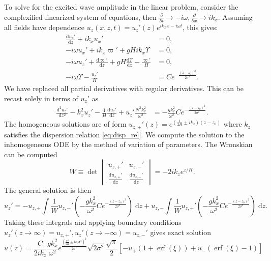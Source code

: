 \documentclass[
        fleqn,
        usenatbib,
    ]{mnras}
\newcommand*{\rd}[2]{\frac{\mathrm{d}#1}{\mathrm{d}#2}}
\newcommand*{\rtd}[2]{\frac{\mathrm{d}^2#1}{\mathrm{d}#2^2}}
\newcommand*{\pd}[2]{\frac{\partial#1}{\partial#2}}
\newcommand*{\p}[1]{\left(#1\right)}
\newcommand*{\s}[1]{\left[#1\right]}
\DeclareMathOperator*{\erf}{erf}
\begin{document}
To solve for the excited wave amplitude in the linear problem, consider the
complexified linearized system of equations, then $\pd{}{t} \to -i\omega,
\pd{}{x} \to ik_x$. Assuming all fields have dependence $u_z(x, z, t) = u_z'(z)
e^{ik_xx - i\omega t}$, this gives:
\begin{align*}
    \rd{u_{z}'}{z} + ik_xu_x' &= 0,\\
    -i\omega u_x' + ik_x \varpi' + gHik_x \Upsilon &= 0,\\
    -i\omega u_{z}' + \rd{\varpi'}{z} + gH\rd{\Upsilon}{z}
        - \frac{\varpi'}{H} &= 0,\\
    -i\omega \Upsilon - \frac{u_{z}'}{H} &=
        Ce^{-\frac{(z - z_0)^2}{2\sigma^2}}.
\end{align*}
We have replaced all partial derivatives with regular derivatives. This can be
recast solely in terms of $u_{z}'$ as
\begin{align*}
     \rtd{u_{z}'}{z} - k_x^2u_{z}' - \frac{1}{H}\rd{u_{z}'}{z}
        + u_{z}'\frac{N^2k_x^2}{\omega^2} &=
    -\frac{gk_x^2}{\omega^2}Ce^{-\frac{(z - z_0)^2}{2\sigma^2}}
        .\label{eq:narrow_inhomo}
\end{align*}
The homogeneous solutions are of form $u_{z,\pm}'(z) = e^{\p{\frac{1}{2H} \pm
ik_z}\p{z - z_0}}$ where $k_z$ satisfies the dispersion relation
\autoref{eq:disp_rel}. We compute the solution to the inhomogeneous ODE by the
method of variation of parameters. The Wronskian can be computed
\begin{equation}
    W \equiv \det \begin{vmatrix}
        u_{z,+}' & u_{z,-}' \\[4pt]
        \rd{u_{z,+}'}{z} & \rd{u_{z,-}'}{z}
    \end{vmatrix} = -2ik_ze^{z/H}.
\end{equation}
The general solution is then
\begin{equation}
    u_z' = -u_{z,+}\int \frac{1}{W} u_{z,-}' \p{-\frac{gk_x^2}{\omega^2}
            Ce^{-\frac{(z - z_0)^2}{2\sigma^2}}}\;\mathrm{d}z
        + u_{z,-}\int \frac{1}{W} u_{z,+}' \p{-\frac{gk_x^2}{\omega^2}
            Ce^{-\frac{(z - z_0)^2}{2\sigma^2}}}\;\mathrm{d}z.
\end{equation}
Taking these integrals and applying boundary conditions $u_z'\p{z \to \infty} =
u_{z,+}', u_z'\p{z \to -\infty} = u_{z,-}'$ gives exact solution
\begin{equation}
    u(z) = \frac{C}{2ik_z}\frac{gk_x^2}{\omega^2}
            e^{\frac{\p{\frac{\sigma^2}{2H} \pm ik_z\sigma^2}^2}{2\sigma^2}}
                \sqrt{2\sigma^2} \frac{\sqrt{\pi}}{2}\s{
                    -u_+\p{1 + \erf\p{\xi}}
                    + u_- \p{\erf\p{\xi} - 1}}
\end{equation}
\end{document}
